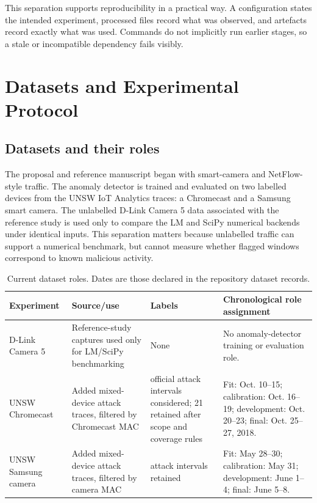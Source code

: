 \documentclass[11pt,a4paper]{article}
\begin{document}
This separation supports reproducibility in a practical way. A configuration states the intended experiment, processed files record what was observed, and artefacts record exactly what was used. Commands do not implicitly run earlier stages, so a stale or incompatible dependency fails visibly.

\section{Datasets and Experimental Protocol}

\subsection{Datasets and their roles}

The proposal and reference manuscript began with smart-camera and NetFlow-style traffic. The anomaly detector is trained and evaluated on two labelled devices from the UNSW IoT Analytics traces: a Chromecast and a Samsung smart camera. The unlabelled D-Link Camera 5 data associated with the reference study is used only to compare the LM and SciPy numerical backends under identical inputs. This separation matters because unlabelled traffic can support a numerical benchmark, but cannot measure whether flagged windows correspond to known malicious activity.

\begin{table}[ht]
\centering
\small
\begin{tabularx}{\textwidth}{>{\raggedright\arraybackslash}p{} >{\raggedright\arraybackslash}p{} >{\raggedright\arraybackslash}p{} X}
\toprule
\textbf{Experiment} & \textbf{Source/use} & \textbf{Labels} & \textbf{Chronological role assignment} \\
\midrule
D-Link Camera 5 & Reference-study captures used only for LM/SciPy benchmarking & None & No anomaly-detector training or evaluation role. \\
UNSW Chromecast & Added mixed-device attack traces, filtered by Chromecast MAC & 27 official attack intervals considered; 21 retained after scope and coverage rules & Fit: Oct. 10--15; calibration: Oct. 16--19; development: Oct. 20--23; final: Oct. 25--27, 2018. \\
UNSW Samsung camera & Added mixed-device attack traces, filtered by camera MAC & 42 attack intervals retained & Fit: May 28--30; calibration: May 31; development: June 1--4; final: June 5--8. \\
\bottomrule
\end{tabularx}
\caption{Current dataset roles. Dates are those declared in the repository dataset records.}
\label{tab:datasets}
\end{table}
\end{document}
